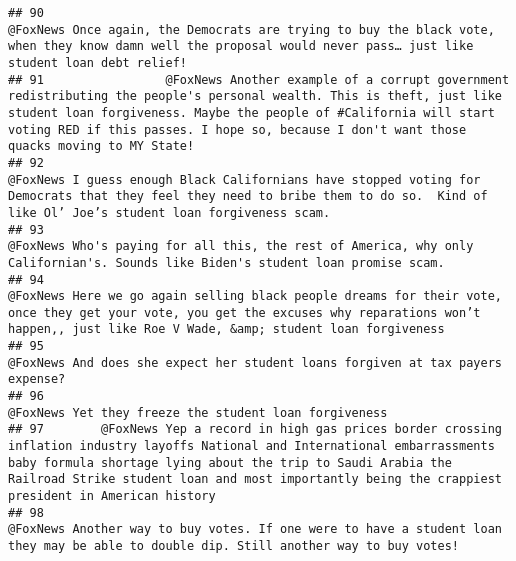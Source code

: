 \documentclass[
]{article}
\begin{document}
\begin{verbatim}
## 90                                                                                                                                        @FoxNews Once again, the Democrats are trying to buy the black vote, when they know damn well the proposal would never pass… just like student loan debt relief!
## 91                 @FoxNews Another example of a corrupt government redistributing the people's personal wealth. This is theft, just like student loan forgiveness. Maybe the people of #California will start voting RED if this passes. I hope so, because I don't want those quacks moving to MY State!
## 92                                                                                                                    @FoxNews I guess enough Black Californians have stopped voting for Democrats that they feel they need to bribe them to do so.  Kind of like Ol’ Joe’s student loan forgiveness scam.
## 93                                                                                                                                                                         @FoxNews Who's paying for all this, the rest of America, why only Californian's. Sounds like Biden's student loan promise scam.
## 94                                                                                                  @FoxNews Here we go again selling black people dreams for their vote, once they get your vote, you get the excuses why reparations won’t happen,, just like Roe V Wade, &amp; student loan forgiveness
## 95                                                                                                                                                                                                                          @FoxNews And does she expect her student loans forgiven at tax payers expense?
## 96                                                                                                                                                                                                                                                   @FoxNews Yet they freeze the student loan forgiveness
## 97        @FoxNews Yep a record in high gas prices border crossing inflation industry layoffs National and International embarrassments baby formula shortage lying about the trip to Saudi Arabia the Railroad Strike student loan and most importantly being the crappiest president in American history
## 98                                                                                                                                                                   @FoxNews Another way to buy votes. If one were to have a student loan they may be able to double dip. Still another way to buy votes!

\end{verbatim}
\end{document}
